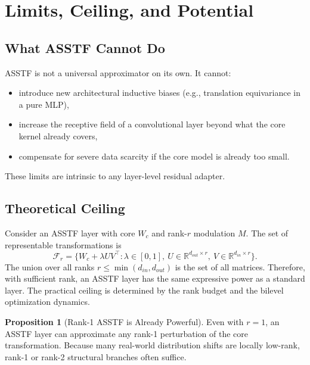 \documentclass[11pt,a4paper]{article}
\theoremstyle{definition}
\newtheorem{proposition}{Proposition}[section]
\begin{document}
\section{Limits, Ceiling, and Potential}
\label{sec:limits}

\subsection{What ASSTF Cannot Do}
\label{subsec:cannot}

ASSTF is not a universal approximator on its own. It cannot:
\begin{itemize}
    \item introduce new architectural inductive biases (e.g., translation equivariance in a pure MLP),
    \item increase the receptive field of a convolutional layer beyond what the core kernel already covers,
    \item compensate for severe data scarcity if the core model is already too small.
\end{itemize}
These limits are intrinsic to any layer-level residual adapter.

\subsection{Theoretical Ceiling}
\label{subsec:ceiling}

Consider an ASSTF layer with core $W_c$ and rank-$r$ modulation $M$. The set of representable transformations is
\begin{equation}
    \mathcal{F}_r = \{ W_c + \lambda U V^{\top} : \lambda \in [0,1],\ U \in \mathbb{R}^{d_{out}\times r},\ V \in \mathbb{R}^{d_{in}\times r} \}.
\end{equation}
The union over all ranks $r \le \min(d_{in}, d_{out})$ is the set of all matrices. Therefore, with sufficient rank, an ASSTF layer has the same expressive power as a standard layer. The practical ceiling is determined by the rank budget and the bilevel optimization dynamics.

\begin{proposition}[Rank-1 ASSTF is Already Powerful]
    \label{prop:rank1}
    Even with $r=1$, an ASSTF layer can approximate any rank-1 perturbation of the core transformation. Because many real-world distribution shifts are locally low-rank, rank-1 or rank-2 structural branches often suffice.
\end{proposition}
\end{document}
